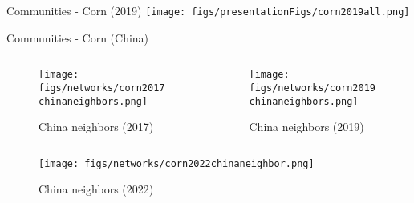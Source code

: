 \documentclass[10pt,xcolor={dvipsnames}]{beamer}
\begin{document}
\begin{frame}{Communities - Corn (2019)}
    \texttt{[image: figs/presentationFigs/corn2019all.png]}
\end{frame}

\iffalse
\begin{frame}{Communities - Corn (China)}

\begin{columns}[onlytextwidth]
    \begin{column}{.5\textwidth}
        \begin{minipage}[t][.5\textheight][t]{\textwidth}
            \begin{figure}
                \caption*{\tiny China neighbors (2017)}
                \texttt{[image: figs/networks/corn2017chinaneighbors.png]}
            \end{figure}
        \end{minipage}
    \end{column}
\hfill
    \begin{column}{.5\textwidth}
        \begin{minipage}[t][.5\textheight][t]{\textwidth}
            \begin{figure}
                \caption*{\tiny China neighbors (2019)}
                \texttt{[image: figs/networks/corn2019chinaneighbors.png]}\\
            \end{figure}
        \end{minipage}
    \end{column}
\end{columns}
\vspace{-35pt}
\begin{figure}
    \centering
    \caption*{\tiny China neighbors (2022)}
    \texttt{[image: figs/networks/corn2022chinaneighbor.png]}    
\end{figure}
\end{frame}
\end{document}

